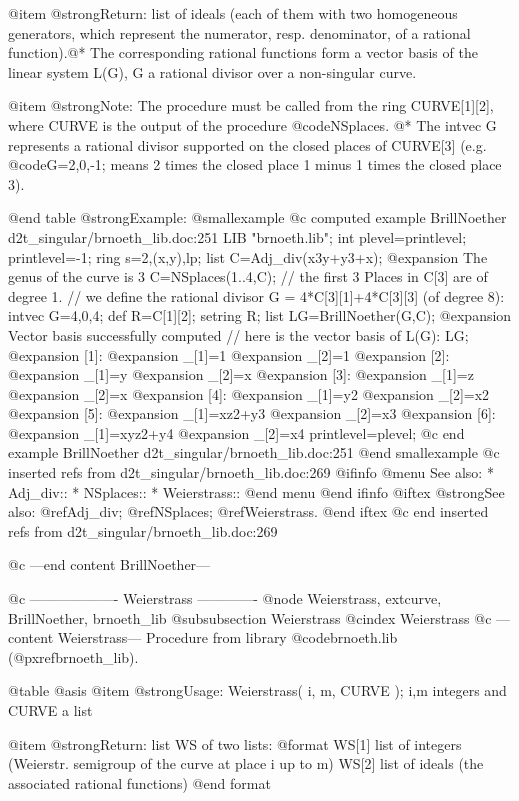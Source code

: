 @item @strong{Return:}
list of ideals (each of them with two homogeneous generators,
which represent the numerator, resp. denominator, of a rational
function).@*
The corresponding rational functions form a vector basis of the
linear system L(G), G a rational divisor over a non-singular curve.

@item @strong{Note:}
The procedure must be called from the ring CURVE[1][2], where
CURVE is the output of the procedure @code{NSplaces}. @*
The intvec G represents a rational divisor supported on the closed
places of CURVE[3] (e.g. @code{G=2,0,-1;} means 2 times the closed
place 1 minus 1 times the closed place 3).

@end table
@strong{Example:}
@smallexample
@c computed example BrillNoether d2t_singular/brnoeth_lib.doc:251 
LIB "brnoeth.lib";
int plevel=printlevel;
printlevel=-1;
ring s=2,(x,y),lp;
list C=Adj_div(x3y+y3+x);
@expansion{} The genus of the curve is 3
C=NSplaces(1..4,C);
// the first 3 Places in C[3] are of degree 1.
// we define the rational divisor G = 4*C[3][1]+4*C[3][3] (of degree 8):
intvec G=4,0,4;
def R=C[1][2];
setring R;
list LG=BrillNoether(G,C);
@expansion{} Vector basis successfully computed 
// here is the vector basis of L(G):
LG;
@expansion{} [1]:
@expansion{}    _[1]=1
@expansion{}    _[2]=1
@expansion{} [2]:
@expansion{}    _[1]=y
@expansion{}    _[2]=x
@expansion{} [3]:
@expansion{}    _[1]=z
@expansion{}    _[2]=x
@expansion{} [4]:
@expansion{}    _[1]=y2
@expansion{}    _[2]=x2
@expansion{} [5]:
@expansion{}    _[1]=xz2+y3
@expansion{}    _[2]=x3
@expansion{} [6]:
@expansion{}    _[1]=xyz2+y4
@expansion{}    _[2]=x4
printlevel=plevel;
@c end example BrillNoether d2t_singular/brnoeth_lib.doc:251
@end smallexample
@c inserted refs from d2t_singular/brnoeth_lib.doc:269
@ifinfo
@menu
See also:
* Adj_div::
* NSplaces::
* Weierstrass::
@end menu
@end ifinfo
@iftex
@strong{See also:}
@ref{Adj_div};
@ref{NSplaces};
@ref{Weierstrass}.
@end iftex
@c end inserted refs from d2t_singular/brnoeth_lib.doc:269

@c ---end content BrillNoether---

@c ------------------- Weierstrass -------------
@node Weierstrass, extcurve, BrillNoether, brnoeth_lib
@subsubsection Weierstrass
@cindex Weierstrass
@c ---content Weierstrass---
Procedure from library @code{brnoeth.lib} (@pxref{brnoeth_lib}).

@table @asis
@item @strong{Usage:}
Weierstrass( i, m, CURVE ); i,m integers and CURVE a list

@item @strong{Return:}
list WS of two lists:
  @format
  WS[1] list of integers (Weierstr. semigroup of the curve at place i up to m)
  WS[2] list of ideals (the associated rational functions)
  @end format

